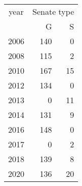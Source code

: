 \footnotesize\begin{tabular}[t]{lrr}
\toprule
\multicolumn{1}{c}{year} & \multicolumn{2}{c}{Senate type} \\
\cmidrule(l{3pt}r{3pt}){1-1} \cmidrule(l{3pt}r{3pt}){2-3}
  & G & S\\
\midrule
2006 & 140 & 0\\
2008 & 115 & 2\\
2010 & 167 & 15\\
2012 & 134 & 0\\
2013 & 0 & 11\\
2014 & 131 & 9\\
2016 & 148 & 0\\
2017 & 0 & 2\\
2018 & 139 & 8\\
2020 & 136 & 20\\
\bottomrule
\end{tabular}
